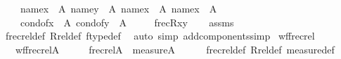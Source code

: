 \begin{isabellebody}
\ \ \ \ {\isachardoublequoteopen}name{}{\isacharparenleft}{\kern0pt}x{\isacharparenright}{\kern0pt}\ {\isasymin}\ A{}{\isachardoublequoteclose}\ {\isachardoublequoteopen}name{}{\isacharparenleft}{\kern0pt}y{\isacharparenright}{\kern0pt}\ {\isasymin}\ A{}{\isachardoublequoteclose}\ {\isachardoublequoteopen}name{}{\isacharparenleft}{\kern0pt}x{\isacharparenright}{\kern0pt}\ {\isasymin}\ A{}{\isachardoublequoteclose}\ {\isachardoublequoteopen}name{}{\isacharparenleft}{\kern0pt}x{\isacharparenright}{\kern0pt}\ {\isasymin}\ A{}{\isachardoublequoteclose}\ \isanewline
\ \ \ \ {\isachardoublequoteopen}cond{\isacharunderscore}{\kern0pt}of{\isacharparenleft}{\kern0pt}x{\isacharparenright}{\kern0pt}\ {\isasymin}\ A{}{\isachardoublequoteclose}\ {\isachardoublequoteopen}cond{\isacharunderscore}{\kern0pt}of{\isacharparenleft}{\kern0pt}y{\isacharparenright}{\kern0pt}\ {\isasymin}\ A{}{\isachardoublequoteclose}\ \isanewline
\ \ \ \ {\isachardoublequoteopen}frecR{\isacharparenleft}{\kern0pt}x{\isacharcomma}{\kern0pt}y{\isacharparenright}{\kern0pt}{\isachardoublequoteclose}\isanewline
%
\isadelimproof
\ \ %
\endisadelimproof
%
\isatagproof
{}\isamarkupfalse%
\ assms\ \isamarkupfalse%
\ frecrel{\isacharunderscore}{\kern0pt}def\ Rrel{\isacharunderscore}{\kern0pt}def\ ftype{\isacharunderscore}{\kern0pt}def\ \isamarkupfalse%
\ {\isacharparenleft}{\kern0pt}auto\ simp\ add{\isacharcolon}{\kern0pt}components{\isacharunderscore}{\kern0pt}simp{\isacharparenright}{\kern0pt}%
\endisatagproof
{\isafoldproof}%
%
\isadelimproof
\isanewline
%
\endisadelimproof
\isanewline
{}\isamarkupfalse%
\ wf{\isacharunderscore}{\kern0pt}frecrel\ {\isacharcolon}{\kern0pt}\ \isanewline
\ \ \ {\isachardoublequoteopen}wf{\isacharparenleft}{\kern0pt}frecrel{\isacharparenleft}{\kern0pt}A{\isacharparenright}{\kern0pt}{\isacharparenright}{\kern0pt}{\isachardoublequoteclose}\isanewline
%
\isadelimproof
%
\endisadelimproof
%
\isatagproof
{}\isamarkupfalse%
\ {\isacharminus}{\kern0pt}\isanewline
\ \ \isamarkupfalse%
\ {\isachardoublequoteopen}frecrel{\isacharparenleft}{\kern0pt}A{\isacharparenright}{\kern0pt}\ {\isasymsubseteq}\ measure{\isacharparenleft}{\kern0pt}A{\isacharcomma}{\kern0pt}{\isasymGamma}{\isacharparenright}{\kern0pt}{\isachardoublequoteclose}\isanewline
\ \ \ \ \isamarkupfalse%
\ frecrel{\isacharunderscore}{\kern0pt}def\ Rrel{\isacharunderscore}{\kern0pt}def\ measure{\isacharunderscore}{\kern0pt}def\isanewline

\end{isabellebody}
